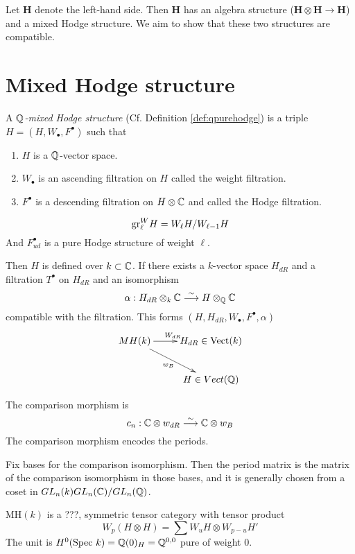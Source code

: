 Let $\mathbf{H}$ denote the left-hand side. Then $\mathbf{H}$ has an algebra structure ($\mathbf{H} \otimes \mathbf{H} \to \mathbf{H}$) and a mixed Hodge structure. We aim to show that these two structures are compatible.

\TODO
 
\section{Mixed Hodge structure}

\begin{defn}
A \emph{$\mathbb{Q}$-mixed Hodge structure} (Cf. Definition \ref{def:qpurehodge}) is a triple $H = (H, W_{\bullet}, F^{\bullet})$ such that
\begin{enumerate}
\item $H$ is a $\mathbb{Q}$-vector space.
\item $W_{\bullet}$ is an ascending filtration on $H$ called the weight filtration.
\item $F^{\bullet}$ is a descending filtration on $H \otimes \mathbb{C}$ and called the Hodge filtration.
\end{enumerate}
\[
\mathrm{gr}^W_{\ell} H = W_{\ell} H / W_{\ell - 1} H
\]
And $F^{\bullet}_{ud}$ is a pure Hodge structure of weight $\ell$.
\end{defn}

Then $H$ is defined over $k \subset \mathbb{C}$. If there exists a $k$-vector space $H_{dR}$ and a filtration $T^{\bullet}$ on $H_{dR}$ and an isomorphism 
\[
\alpha : H_{dR} \otimes_k \mathbb{C} \stackrel{\sim}{\longrightarrow} H \otimes_{\mathbb{Q}} \mathbb{C}
\]
compatible with the filtration. This forms $(H, H_{dR}, W_{\bullet}, F^{\bullet}, \alpha)$
\[
\xymatrix{
MH(k) \ar[r]^{W_{dR}} \ar[dr]_{w_B} & H_{dR} \in \mathrm{Vect}(k) \\
& H \in Vect(\Q)
}
\]

\begin{defn}
The comparison morphism is
\[
c_n : \mathbb{C} \otimes w_{dR} \stackrel{\sim}{\longrightarrow} \mathbb{C} \otimes w_B
\]
The comparison morphism encodes the periods.
\end{defn}
\begin{defn}
Fix bases for the comparison isomorphism. Then the period matrix is the matrix of the comparison isomorphism in those bases, and it is generally chosen from a coset in $GL_n(k)  GL_n(\mathbb{C}) / GL_n(\mathbb{Q})$.
\end{defn}

\begin{prop}
$\mathrm{MH}(k)$ is a ???, symmetric tensor category with tensor product
\[
W_p(H \otimes H) = \sum W_u H \otimes W_{p-u} H'
\]
The unit is $H^0(\mathrm{Spec}~ k) = \mathbb{Q}(0)_H = \mathbb{Q}^{0,0}$ pure of weight $0$.
\end{prop}

